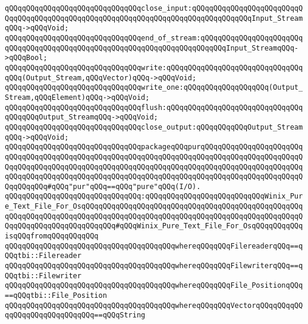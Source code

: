 \newline
\verb|qQQqqQQqqQQqqQQqqQQqqQQqqQQqqQQqclose_input:qQQqqQQqqQQqqQQqqQQqqQQqqQQqqQQqqQQqqQQqqQQqqQQqqQQqqQQqqQQqqQQqqQQqqQQqqQQqqQQqqQQqInput_StreamqQQq->qQQqVoid;|\newline
\verb|qQQqqQQqqQQqqQQqqQQqqQQqqQQqqQQqend_of_stream:qQQqqQQqqQQqqQQqqQQqqQQqqQQqqQQqqQQqqQQqqQQqqQQqqQQqqQQqqQQqqQQqqQQqqQQqqQQqInput_StreamqQQq->qQQqBool;|\newline
\newline
\verb|qQQqqQQqqQQqqQQqqQQqqQQqqQQqqQQqwrite:qQQqqQQqqQQqqQQqqQQqqQQqqQQqqQQqqQQq(Output_Stream,qQQqVector)qQQq->qQQqVoid;|\newline
\verb|qQQqqQQqqQQqqQQqqQQqqQQqqQQqqQQqwrite_one:qQQqqQQqqQQqqQQqqQQq(Output_Stream,qQQqElement)qQQq->qQQqVoid;|\newline
\newline
\verb|qQQqqQQqqQQqqQQqqQQqqQQqqQQqqQQqflush:qQQqqQQqqQQqqQQqqQQqqQQqqQQqqQQqqQQqqQQqOutput_StreamqQQq->qQQqVoid;|\newline
\verb|qQQqqQQqqQQqqQQqqQQqqQQqqQQqqQQqclose_output:qQQqqQQqqQQqOutput_StreamqQQq->qQQqVoid;|\newline
\newline
\verb|qQQqqQQqqQQqqQQqqQQqqQQqqQQqqQQqpackageqQQqpurqQQqqQQqqQQqqQQqqQQqqQQqqQQqqQQqqQQqqQQqqQQqqQQqqQQqqQQqqQQqqQQqqQQqqQQqqQQqqQQqqQQqqQQqqQQqqQQqqQQqqQQqqQQqqQQqqQQqqQQqqQQqqQQqqQQqqQQqqQQqqQQqqQQqqQQqqQQqqQQqqQQqqQQqqQQqqQQqqQQqqQQqqQQqqQQqqQQqqQQqqQQqqQQqqQQqqQQqqQQqqQQqqQQqqQQqqQQqqQQqqQQq#qQQq"pur"qQQq==qQQq"pure"qQQq(I/O).|\newline
\verb|qQQqqQQqqQQqqQQqqQQqqQQqqQQqqQQq:qQQqqQQqqQQqqQQqqQQqqQQqqQQqWinix_Pure_Text_File_For_OsqQQqqQQqqQQqqQQqqQQqqQQqqQQqqQQqqQQqqQQqqQQqqQQqqQQqqQQqqQQqqQQqqQQqqQQqqQQqqQQqqQQqqQQqqQQqqQQqqQQqqQQqqQQqqQQqqQQqqQQqqQQqqQQqqQQqqQQqqQQqqQQqqQQq#qQQqWinix_Pure_Text_File_For_OsqQQqqQQqqQQqisqQQqfromqQQqqQQqqQQq|\newline
\verb|qQQqqQQqqQQqqQQqqQQqqQQqqQQqqQQqqQQqqQQqwhereqQQqqQQqFilereaderqQQq==qQQqtbi::Filereader|\newline
\verb|qQQqqQQqqQQqqQQqqQQqqQQqqQQqqQQqqQQqqQQqwhereqQQqqQQqFilewriterqQQq==qQQqtbi::Filewriter|\newline
\verb|qQQqqQQqqQQqqQQqqQQqqQQqqQQqqQQqqQQqqQQqwhereqQQqqQQqFile_PositionqQQq==qQQqtbi::File_Position|\newline
\verb|qQQqqQQqqQQqqQQqqQQqqQQqqQQqqQQqqQQqqQQqwhereqQQqqQQqVectorqQQqqQQqqQQqqQQqqQQqqQQqqQQqqQQq==qQQqString|\newline
